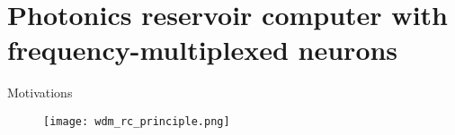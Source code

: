 \section[Photonics RC with frequency-multiplexed neurons]{Photonics reservoir computer with frequency-multiplexed neurons}

\begin{frame}{Motivations}

\end{frame}

\begin{frame}
	\begin{figure}
		\texttt{[image: wdm\_rc\_principle.png]}
		\caption{\cite{AkroutAkram2016Pprc}}
	\end{figure}
\end{frame}

